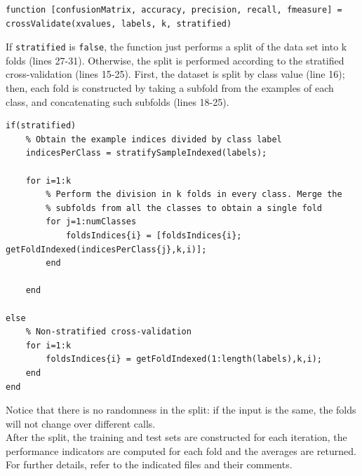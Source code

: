 \documentclass{article}
\begin{document}
\begin{lstlisting}[breaklines=true]
function [confusionMatrix, accuracy, precision, recall, fmeasure] = crossValidate(xvalues, labels, k, stratified)
\end{lstlisting}
If \verb$stratified$ is \verb$false$, the function just performs a split of the data set into k folds (lines 27-31). Otherwise, the split is performed according to the stratified cross-validation (lines 15-25). First, the dataset is split by class value (line 16); then, each fold is constructed by taking a subfold from the examples of each class, and concatenating such subfolds (lines 18-25).
\begin{lstlisting}[firstnumber=14]
if(stratified)
    % Obtain the example indices divided by class label
    indicesPerClass = stratifySampleIndexed(labels);
    
    for i=1:k
        % Perform the division in k folds in every class. Merge the
        % subfolds from all the classes to obtain a single fold
        for j=1:numClasses
            foldsIndices{i} = [foldsIndices{i}; getFoldIndexed(indicesPerClass{j},k,i)];
        end
        
    end    
    
else
    % Non-stratified cross-validation
    for i=1:k
        foldsIndices{i} = getFoldIndexed(1:length(labels),k,i);
    end
end
\end{lstlisting}
Notice that there is no randomness in the split: if the input is the same, the folds will not change over different calls.\\
After the split, the training and test sets are constructed for each iteration, the performance indicators are computed for each fold and the averages are returned. For further details, refer to the indicated files and their comments.
\end{document}

